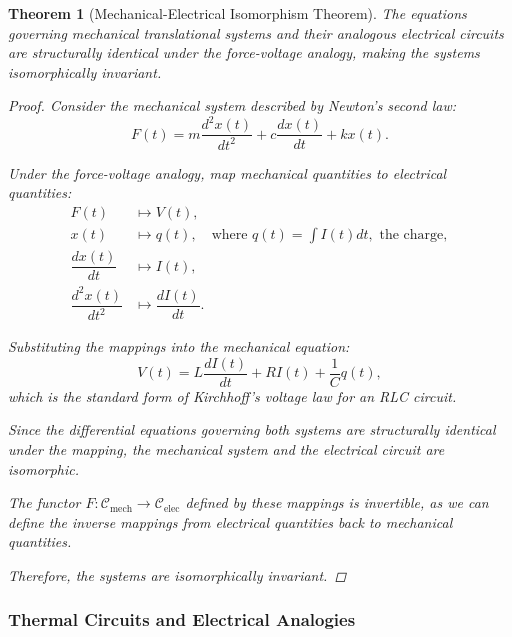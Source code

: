 \documentclass{article}
\newtheorem{theorem}{Theorem}[section]
\theoremstyle{definition}
\theoremstyle{remark}
\begin{document}
	\begin{theorem}[Mechanical-Electrical Isomorphism Theorem]
		The equations governing mechanical translational systems and their analogous electrical circuits are structurally identical under the force-voltage analogy, making the systems isomorphically invariant.
		
		\begin{proof}
			Consider the mechanical system described by Newton's second law:
			\[
			F(t) = m \dfrac{d^2 x(t)}{dt^2} + c \dfrac{d x(t)}{dt} + k x(t).
			\]
			
			Under the force-voltage analogy, map mechanical quantities to electrical quantities:
			\begin{align*}
				F(t) &\mapsto V(t), \\
				x(t) &\mapsto q(t), \quad \text{where } q(t) = \int I(t) dt, \text{ the charge}, \\
				\dfrac{d x(t)}{dt} &\mapsto I(t), \\
				\dfrac{d^2 x(t)}{dt^2} &\mapsto \dfrac{d I(t)}{dt}.
			\end{align*}
			
			Substituting the mappings into the mechanical equation:
			\[
			V(t) = L \dfrac{d I(t)}{dt} + R I(t) + \dfrac{1}{C} q(t),
			\]
			which is the standard form of Kirchhoff's voltage law for an RLC circuit.
			
			Since the differential equations governing both systems are structurally identical under the mapping, the mechanical system and the electrical circuit are isomorphic.
			
			The functor $F: \mathcal{C}_{\text{mech}} \rightarrow \mathcal{C}_{\text{elec}}$ defined by these mappings is invertible, as we can define the inverse mappings from electrical quantities back to mechanical quantities.
			
			Therefore, the systems are isomorphically invariant.
		\end{proof}
	\end{theorem}
	
	\subsubsection{Thermal Circuits and Electrical Analogies}
	
\end{document}

